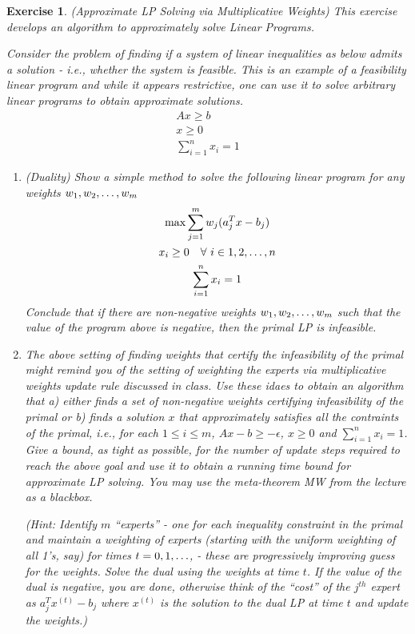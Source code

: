 \documentclass[12pt]{article}
\theoremstyle{colon}
\newtheorem{exercise}{Exercise}
\begin{document}
\clearpage

\begin{exercise}
  (Approximate LP Solving via Multiplicative Weights) This exercise develops an algorithm to approximately solve Linear Programs.

  Consider the problem of finding if a system of linear inequalities as below admits a solution - i.e., whether the system is feasible. This is an example of a feasibility linear program and while it appears restrictive, one can use it to solve arbitrary linear programs to obtain approximate solutions.
  \begin{gather*}
     A x \geq b \\
     x \geq 0 \\
     \sum_{i=1}^n x_i = 1
  \end{gather*}
  \begin{enumerate}[label=\arabic*)]
    \item (Duality) Show a simple method to solve the following linear program for any weights $w_1, w_2, \mathellipsis, w_m$
      \begin{gather*}
        \max \sum_{j=1}^m w_j (a_j^T x - b_j) \\
        x_i \geq 0 \quad \forall \ i \in {1,2,\mathellipsis,n} \\
        \sum_{i=1}^n x_i = 1
      \end{gather*}
      Conclude that if there are non-negative weights $w_1, w_2, \mathellipsis, w_m$ such that the value of the program above is negative, then the primal LP is infeasible.
    \item The above setting of finding weights that certify the infeasibility of the primal might remind you of the setting of weighting the experts via multiplicative weights update rule discussed in class. Use these idaes to obtain an algorithm that a) either finds a set of non-negative weights certifying infeasibility of the primal or b) finds a solution $x$ that approximately satisfies all the contraints of the primal, i.e., for each $1 \leq i \leq m$, $Ax - b \geq -\epsilon$, $x \geq 0$ and $\sum_{i=1}^n x_i = 1$. Give a bound, as tight as possible, for the number of update steps required to reach the above goal and use it to obtain a running time bound for approximate LP solving. You may use the meta-theorem MW from the lecture as a blackbox.

    (Hint: Identify $m$ ``experts'' - one for each inequality constraint in the primal and maintain a weighting of experts (starting with the uniform weighting of all 1's, say) for times $t = 0,1,\mathellipsis$, - these are progressively improving guess for the weights. Solve the dual using the weights at time $t$. If the value of the dual is negative, you are done, otherwise think of the ``cost'' of the $j^{th}$ expert as $a_j^T x^{(t)} - b_j$ where $x^{(t)}$ is the solution to the dual LP at time $t$ and update the weights.)
  \end{enumerate}
\end{exercise}
\end{document}
